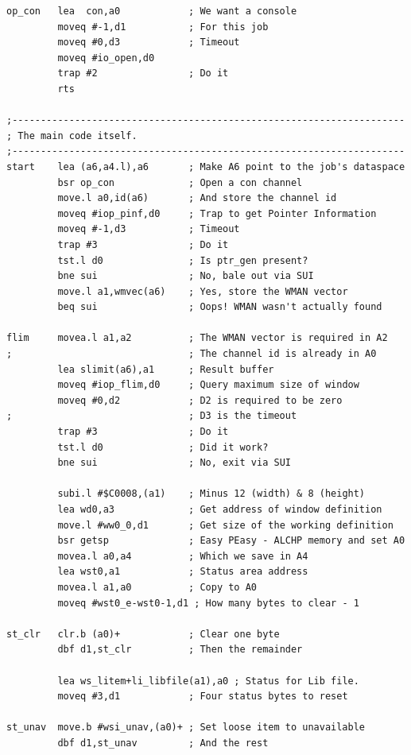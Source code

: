 \begin{lstlisting}[firstnumber=1,caption={LibGen\_asm - Part 1}]
op_con   lea  con,a0            ; We want a console
         moveq #-1,d1           ; For this job
         moveq #0,d3            ; Timeout
         moveq #io_open,d0
         trap #2                ; Do it
         rts

;---------------------------------------------------------------------
; The main code itself.
;---------------------------------------------------------------------
start    lea (a6,a4.l),a6       ; Make A6 point to the job's dataspace
         bsr op_con             ; Open a con channel
         move.l a0,id(a6)       ; And store the channel id
         moveq #iop_pinf,d0     ; Trap to get Pointer Information
         moveq #-1,d3           ; Timeout
         trap #3                ; Do it
         tst.l d0               ; Is ptr_gen present?
         bne sui                ; No, bale out via SUI
         move.l a1,wmvec(a6)    ; Yes, store the WMAN vector
         beq sui                ; Oops! WMAN wasn't actually found

flim     movea.l a1,a2          ; The WMAN vector is required in A2
;                               ; The channel id is already in A0
         lea slimit(a6),a1      ; Result buffer
         moveq #iop_flim,d0     ; Query maximum size of window
         moveq #0,d2            ; D2 is required to be zero
;                               ; D3 is the timeout
         trap #3                ; Do it
         tst.l d0               ; Did it work?
         bne sui                ; No, exit via SUI

         subi.l #$C0008,(a1)    ; Minus 12 (width) & 8 (height)
         lea wd0,a3             ; Get address of window definition
         move.l #ww0_0,d1       ; Get size of the working definition
         bsr getsp              ; Easy PEasy - ALCHP memory and set A0
         movea.l a0,a4          ; Which we save in A4
         lea wst0,a1            ; Status area address
         movea.l a1,a0          ; Copy to A0
         moveq #wst0_e-wst0-1,d1 ; How many bytes to clear - 1

st_clr   clr.b (a0)+            ; Clear one byte
         dbf d1,st_clr          ; Then the remainder

         lea ws_litem+li_libfile(a1),a0 ; Status for Lib file.
         moveq #3,d1            ; Four status bytes to reset

st_unav  move.b #wsi_unav,(a0)+ ; Set loose item to unavailable
         dbf d1,st_unav         ; And the rest
\end{lstlisting}

